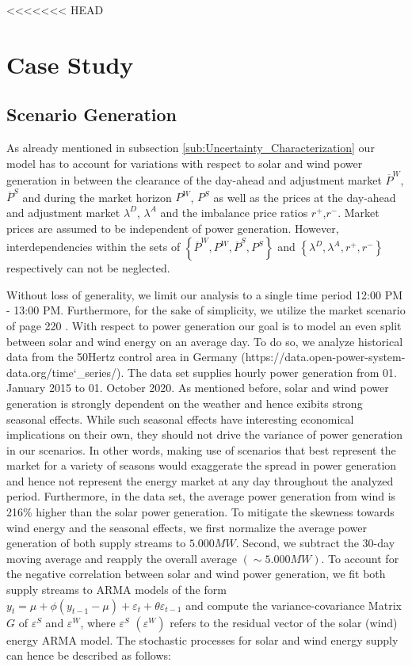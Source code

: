 <<<<<<< HEAD
\section{Case Study}

\subsection{Scenario Generation}
As already mentioned in subsection \ref{sub:Uncertainty_Characterization} our model has to account for variations with respect to solar and wind power generation in between the clearance of the day-ahead and adjustment market $\overline{P}^{W}$,$\overline{P}^{S}$ and during the market horizon ${P}^{W}$, ${P}^{S}$ as well as the prices at the day-ahead and adjustment market $\lambda^D$, $\lambda^A$ and the imbalance price ratios $r^+$,$r^-$. Market prices are assumed to be independent of power generation. However, interdependencies within the sets of $\left\lbrace\overline{P}^{W},{P}^{W},\overline{P}^{S},{P}^{S}\right\rbrace$ and $\left\lbrace\lambda^D,\lambda^A,r^+,r^-\right\rbrace$ respectively can not be neglected. 


Without loss of generality, we limit our analysis to a single time period 12:00 PM - 13:00 PM. Furthermore, for the sake of simplicity, we utilize the market scenario of page 220 \cite{Conejo10}. %
With respect to power generation our goal is to model an even split between solar and wind energy on an average day. To do so, we analyze historical data from the 50Hertz control area in Germany (https://data.open-power-system-data.org/time\char`_series/). The data set supplies hourly power generation from 01. January 2015 to 01. October 2020. As mentioned before, solar and wind power generation is strongly dependent on the weather and hence exibits strong seasonal effects. While such seasonal effects have interesting economical implications on their own, they should not drive the variance of power generation in our scenarios. In other words, making use of scenarios that best represent the market for a variety of seasons would exaggerate the spread in power generation and hence not represent the energy market at any day throughout the analyzed period. Furthermore, in the data set, the average power generation from wind is 216\% higher than the solar power generation. To mitigate the skewness towards wind energy and the seasonal effects, we first normalize the average power generation of both supply streams to $5.000 MW$. Second, we subtract the 30-day moving average and reapply the overall average $\left(\sim 5.000 MW\right)$. To account for the negative correlation between solar and wind power generation, we fit both supply streams to ARMA models of the form $y_t = \mu + \phi \left(y_{t-1}-\mu\right)+\varepsilon_t + \theta\varepsilon_{t-1}$ and compute the variance-covariance Matrix $G$ of $\varepsilon^S$ and $\varepsilon^W$, where $\varepsilon^S$ $\left(\varepsilon^W\right)$ refers to the residual vector of the solar (wind) energy ARMA model. The stochastic processes 
for solar and wind energy supply can hence be described as follows:

